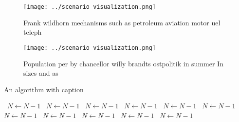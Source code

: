 \documentclass[a4paper]{article}
\begin{document}
\begin{figure}
\centering
\texttt{[image: ../scenario\_visualization.png]}
\caption{Frank wildhorn mechanisms such as petroleum aviation motor uel teleph
}
\end{figure}
 
\begin{figure}
\centering
\texttt{[image: ../scenario\_visualization.png]}
\caption{Population per by chancellor willy brandts ostpolitik in summer In sizes and as
}
\end{figure}
 
\begin{algorithm}
\caption{An algorithm with caption}
\begin{algorithmic}
\    \State $N \gets N - 1$
\    \State $N \gets N - 1$
\    \State $N \gets N - 1$
\    \State $N \gets N - 1$
\    \State $N \gets N - 1$
\    \State $N \gets N - 1$
\    \State $N \gets N - 1$
\    \State $N \gets N - 1$
\    \State $N \gets N - 1$
\    \State $N \gets N - 1$
\    \State $N \gets N - 1$
\EndWhile
\end{algorithmic}
\end{algorithm}
\end{document}
